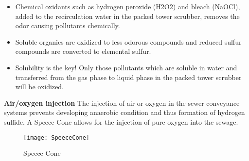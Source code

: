 \begin{itemize}
\item Chemical oxidants such as hydrogen peroxide (H2O2) and bleach (NaOCl), added to the recirculation water in the packed tower scrubber, removes the odor causing pollutants chemically.
\item Soluble organics are oxidized to less odorous compounds and reduced sulfur compounds are converted to elemental sulfur.
\item Solubility is the key! Only those pollutants which are soluble in water and transferred from the gas phase to liquid phase in the packed tower scrubber will be oxidized.
\end{itemize}
\newpage


\textbf{Air/oxygen injection}
The injection of air or oxygen in the sewer conveyance systems prevents developing anaerobic condition and thus  formation of hydrogen sulfide.  A Speece Cone allows for the injection of pure oxygen into the sewage.

\begin{figure}
	\begin{center}
		\texttt{[image: SpeeceCone]}
			\caption{Speece Cone}
	\end{center}
	
	\end{figure}
\vspace{0.5cm}









